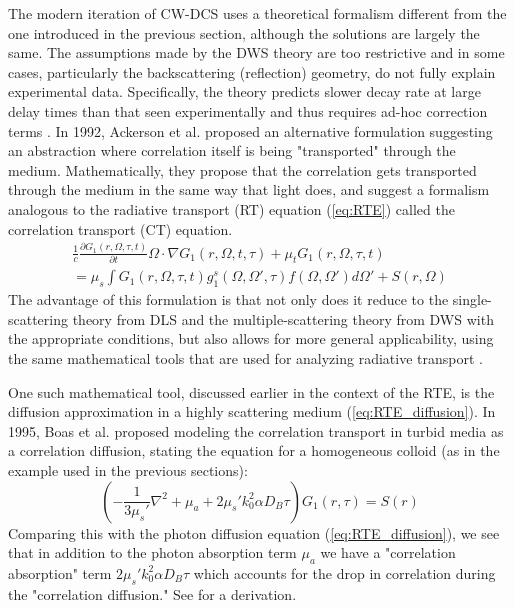 The modern iteration of CW-DCS uses a theoretical formalism different from the one introduced in the previous section, although the solutions are largely the same. The assumptions made by the DWS theory are too restrictive and in some cases, particularly the backscattering (reflection) geometry, do not fully explain experimental data. Specifically, the theory predicts slower decay rate at large delay times than that seen experimentally \cite[ch. 16.2.4]{Brown1993} and thus requires ad-hoc correction terms \cite[ch. 16.2.3.4]{Brown1993}. In 1992, Ackerson et al. \cite{Ackerson1992} proposed an alternative formulation suggesting an abstraction where correlation itself is being "transported" through the medium. Mathematically, they propose that the correlation gets transported through the medium in the same way that light does, and suggest a formalism analogous to the radiative transport (RT) equation (\autoref{eq:RTE}) called the correlation transport (CT) equation.
\begin{multline}\label{eq:CT}
\frac{1}{c}\frac{\partial G_1(r,\Omega,\tau,t)}{\partial t}\Omega\cdot\nabla G_1(r,\Omega,t,\tau) + \mu_t G_1(r,\Omega,\tau,t) \\
= \mu_s\int G_1(r,\Omega,\tau,t) g_1^s(\Omega,\Omega',\tau)f(\Omega, \Omega')d\Omega' + S(r,\Omega)
\end{multline}
The advantage of this formulation is that not only does it reduce to the single-scattering theory from DLS and the multiple-scattering theory from DWS with the appropriate conditions, but also allows for more general applicability, using the same mathematical tools that are used for analyzing radiative transport \cite{Ackerson1992, Dougherty1994}.

One such mathematical tool, discussed earlier in the context of the RTE, is the diffusion approximation in a highly scattering medium (\autoref{eq:RTE_diffusion}). In 1995, Boas et al. \cite{Boas1995} proposed modeling the correlation transport in turbid media as a correlation diffusion, stating the equation for a homogeneous colloid (as in the example used in the previous sections):
\begin{equation}\label{eq:CT_diffusion_Brownian}
\left(-\frac{1}{3\mu_s'}\nabla^2 + \mu_a + 2\mu_s'k_0^2 \alpha D_B \tau\right)G_1(r,\tau) = S(r)
\end{equation}
Comparing this with the photon diffusion equation (\autoref{eq:RTE_diffusion}), we see that in addition to the photon absorption term $\mu_a$ we have a "correlation absorption" term $2\mu_s'k_0^2 \alpha D_B \tau$ which accounts for the drop in correlation during the "correlation diffusion." See \cite{Boas1997} for a derivation.

